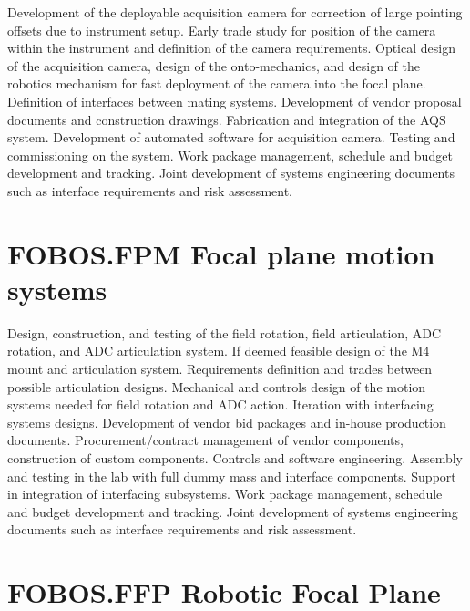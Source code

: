 \documentclass[oneside,11pt]{amsart}
\begin{document}
Development of the deployable acquisition camera for correction of
large pointing offsets due to instrument setup. Early trade study
for position of the camera within the instrument and definition of
the camera requirements. Optical design of the acquisition camera,
design of the onto-mechanics, and design of the robotics mechanism
for fast deployment of the camera into the focal plane. Definition of
interfaces between mating systems. Development of vendor proposal
documents and construction drawings. Fabrication and integration of
the AQS system. Development of automated software for acquisition
camera. Testing and commissioning on the system. Work package
management, schedule and budget development and tracking. Joint
development of systems engineering documents such as interface
requirements and risk assessment.

\section{FOBOS.FPM Focal plane motion systems}

Design, construction, and testing of the field rotation, field
articulation, ADC rotation, and ADC articulation system. If deemed
feasible design of the M4 mount and articulation system. Requirements
definition and trades between possible articulation designs.
Mechanical and controls design of the motion systems needed for field
rotation and ADC action. Iteration with interfacing systems designs.
Development of vendor bid packages and in-house production documents.
Procurement/contract management of vendor components, construction of
custom components. Controls and software engineering. Assembly and
testing in the lab with full dummy mass and interface components.
Support in integration of interfacing subsystems. Work package
management, schedule and budget development and tracking. Joint
development of systems engineering documents such as interface
requirements and risk assessment.

\section{FOBOS.FFP Robotic Focal Plane}
\end{document}

